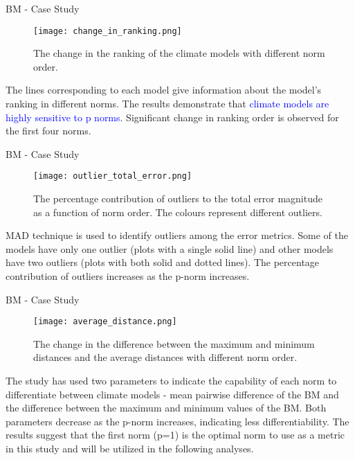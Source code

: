 \documentclass[xcolor={dvipsnames}]{beamer}
\begin{document}
\begin{frame}{BM - Case Study}
\begin{minipage}{0.5\textwidth}
\begin{figure}
    \centering
    \texttt{[image: change\_in\_ranking.png]}
    \captionsetup{font=scriptsize} 
    \caption{The change in the ranking of the climate models with different norm order.}
    \label{fig:change_in_ranking}
\end{figure}
\end{minipage}%
\begin{minipage}{0.5\textwidth}
The lines corresponding to each model give information about the model’s ranking in different norms. The results demonstrate that \textcolor{blue}{climate models are highly sensitive to p norms}. Significant change in ranking order is observed for the first four norms.
\end{minipage}
\end{frame}

\begin{frame}{BM - Case Study}

\begin{figure}
  \centering
  \texttt{[image: outlier\_total\_error.png]}
  \captionsetup{font=scriptsize, skip=0pt, belowskip=-10pt}  
  \caption{The percentage contribution of outliers to the total error magnitude as a function of norm order. The colours represent different outliers.}
  \label{fig:outlier_total_error}
\end{figure}

MAD technique is used to identify outliers among the error metrics. Some of the models have only one outlier (plots with a single solid line) and other models have two outliers (plots with both solid and dotted lines). The percentage contribution of outliers increases as the p-norm increases.

\end{frame}

\begin{frame}{BM - Case Study}
\begin{minipage}{0.5\textwidth}
\begin{figure}
    \centering
    \texttt{[image: average\_distance.png]}
    \captionsetup{font=scriptsize} 
    \caption{The change in the difference between the maximum and minimum distances and the average distances with different norm order.}
    \label{fig:average_distance}
\end{figure}
\end{minipage}%
\begin{minipage}{0.5\textwidth}
The study has used two parameters to indicate the capability of each norm to differentiate between climate models - mean pairwise difference of the BM and the difference between the maximum and minimum values of the BM. Both parameters decrease as the p-norm increases, indicating less differentiability. The results suggest that the first norm (p=1) is the optimal norm to use as a metric in this study and will be utilized in the following analyses.
\end{minipage}
    
\end{frame}
\end{document}
